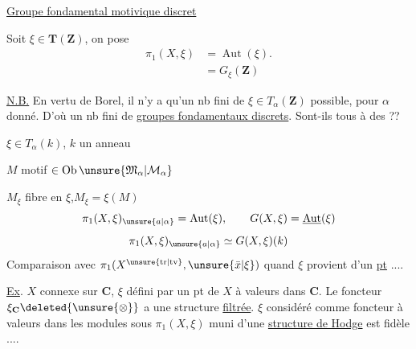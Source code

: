 \uline{Groupe fondamental motivique discret}

Soit $\xi\in\mathbf T(\mathbf Z)$, on pose
\[
\begin{aligned}
\pi_1(X,\xi)&=\operatorname{Aut}(\xi).\\
&=G_\xi(\mathbf Z)
\end{aligned}
\]

\uline{N.B.} En vertu de Borel, il n'y a qu'un nb fini de $\xi\in T_\alpha(\mathbf Z)$ possible, pour $\alpha$ donné.
D'où un nb fini de \uline{groupes fondamentaux discrets}.
Sont-ils tous  à des   ??

$\xi\in T_\alpha(k)$, $k$ un anneau

$M$ motif $\in\operatorname{Ob}\unsure{\mathfrak M_\alpha|\mathcal M_\alpha}$

$M_\xi$ fibre en $\xi$,\qquad $M_\xi=\xi(M)$
\[
\pi_1(X,\xi)_{\unsure{a|\alpha}}=\operatorname{Aut}(\xi),\qquad
G(X,\xi)=\underline{\operatorname{Aut}}(\xi)
\]
\[
\pi_1(X,\xi)_{\unsure{a|\alpha}}\simeq G(X,\xi)(k)
\]
Comparaison avec $\pi_1(X^{\unsure{\mathrm{tr}|\mathrm{tv}}},\unsure{\bar x|\xi})$ quand $\xi$ provient d'un \uline{pt}  ....

\uline{Ex}. $X$ connexe sur $\mathbf C$, $\xi$ défini par un pt de $X$ à valeurs dans $\mathbf C$.
Le foncteur $\xi_{\mathbf C}\deleted{\unsure{\otimes}}$ a une structure \uline{filtrée}.
$\xi$ considéré comme foncteur à valeurs dans les modules sous $\pi_1(X,\xi)$ muni d'une \uline{structure de Hodge} est  fidèle ....

